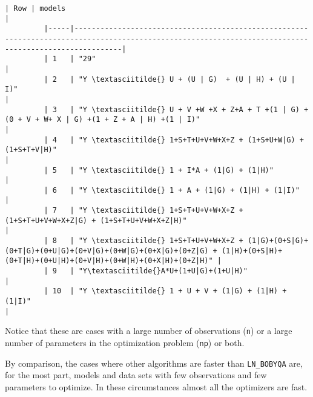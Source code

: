\documentclass{article}
\begin{document}
\begin{Verbatim}[commandchars=\\\{\}]
         | Row | models                                                                                                                                                |
         |-----|-------------------------------------------------------------------------------------------------------------------------------------------------------|
         | 1   | "29"                                                                                                                                                  |
         | 2   | "Y \textasciitilde{} U + (U | G)  + (U | H) + (U | I)"                                                                                                                |
         | 3   | "Y \textasciitilde{} U + V +W +X + Z+A + T +(1 | G) +(0 + V + W+ X | G) +(1 + Z + A | H) +(1 | I)"                                                                    |
         | 4   | "Y \textasciitilde{} 1+S+T+U+V+W+X+Z + (1+S+U+W|G) + (1+S+T+V|H)"                                                                                                     |
         | 5   | "Y \textasciitilde{} 1 + I*A + (1|G) + (1|H)"                                                                                                                         |
         | 6   | "Y \textasciitilde{} 1 + A + (1|G) + (1|H) + (1|I)"                                                                                                                   |
         | 7   | "Y \textasciitilde{} 1+S+T+U+V+W+X+Z + (1+S+T+U+V+W+X+Z|G) + (1+S+T+U+V+W+X+Z|H)"                                                                                     |
         | 8   | "Y \textasciitilde{} 1+S+T+U+V+W+X+Z + (1|G)+(0+S|G)+(0+T|G)+(0+U|G)+(0+V|G)+(0+W|G)+(0+X|G)+(0+Z|G) + (1|H)+(0+S|H)+(0+T|H)+(0+U|H)+(0+V|H)+(0+W|H)+(0+X|H)+(0+Z|H)" |
         | 9   | "Y\textasciitilde{}A*U+(1+U|G)+(1+U|H)"                                                                                                                               |
         | 10  | "Y \textasciitilde{} 1 + U + V + (1|G) + (1|H) + (1|I)"                                                                                                               |
\end{Verbatim}
        
    Notice that these are cases with a large number of observations
(\texttt{n}) or a large number of parameters in the optimization problem
(\texttt{np}) or both.

By comparison, the cases where other algorithms are faster than
\texttt{LN\_BOBYQA} are, for the most part, models and data sets with
few observations and few parameters to optimize. In these circumstances
almost all the optimizers are fast.
\end{document}
